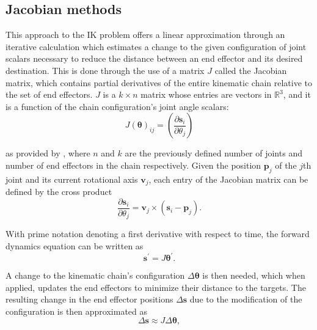 \subsection{Jacobian methods}
This approach to the IK problem \cite{BALESTRINO19842435, wolovich, Baillieul} offers
a linear approximation through an iterative calculation which estimates a change
to the given configuration of joint scalars necessary to reduce the distance
between an end effector and its desired destination. This is done through the
use of a matrix \(J\) called the Jacobian matrix, which contains partial
derivatives of the entire kinematic chain relative to the set of end effectors.
\(J\) is a \(k \times n\) matrix whose entries are vectors in \(\mathbb{R}^3\),
and it is a function of the chain configuration's joint angle scalars:
\begin{equation}
    J(\bm{\theta})_{ij} = \left(\frac{\partial \mathbf{s}_i}{\partial
    \theta_j}\right)
\end{equation}

\noindent as provided by \cite{rbuss_ik_survey}, where \(n\) and \(k\) are the
previously defined number of joints and number of end effectors in the chain
respectively. Given the position \(\mathbf{p}_j\) of the \(j\)th joint and its
current rotational axis \(\mathbf{v}_j\), each entry of the Jacobian matrix can
be defined by the cross product
\begin{equation}
    \frac{\partial \mathbf{s}_i}{\partial \theta_j} = \mathbf{v}_j \times (\mathbf{s}_i
    - \mathbf{p}_j).
\end{equation}

With prime notation denoting a first derivative with respect to time, the
forward dynamics equation can be written as
\begin{equation}
    \mathbf{s}^\prime = J\bm{\theta}^\prime.
\end{equation}

A change to the kinematic chain's configuration \(\Delta \bm{\theta}\) is then
needed, which when applied, updates the end effectors to minimize their distance
to the targets. The resulting change in the end effector positions \(\Delta
\mathbf{s}\) due to the modification of the configuration is then approximated
as
\begin{equation}
    \Delta \mathbf{s} \approx J \Delta \bm{\theta},
    \label{eqn:fk_approx}
\end{equation}

